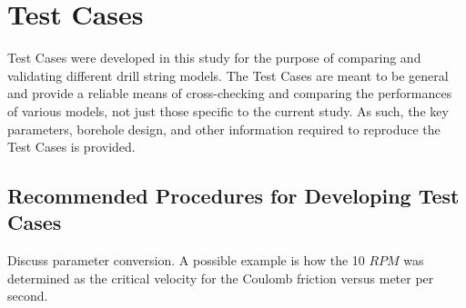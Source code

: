 \chapter{Test Cases}
\label{ch:testcases}
Test Cases were developed in this study for the purpose of comparing and validating different drill string models.  The Test Cases are meant to be general and provide a reliable means of cross-checking and comparing the performances of various models, not just those specific to the current study.  As such, the key parameters, borehole design, and other information required to reproduce the Test Cases is provided.

\section{Recommended Procedures for Developing Test Cases}
\notfinished{}
Discuss parameter conversion.  A possible example is how the 10 $RPM$ was determined as the critical velocity for the Coulomb friction versus meter per second.

